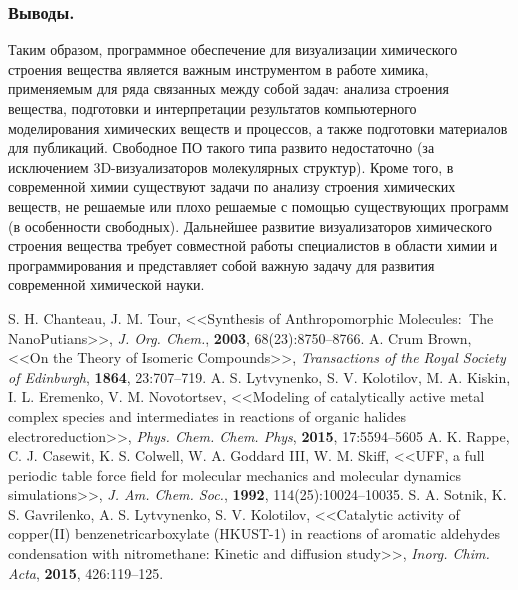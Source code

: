 \documentclass[10pt, a5paper]{article}
\begin{document}
\subsubsection*{Выводы.}

Таким образом, программное обеспечение для визуализации химического строения вещества является важным инструментом в работе химика, применяемым для ряда связанных между собой задач: анализа строения вещества, подготовки и интерпретации результатов компьютерного моделирования химических веществ и процессов, а также подготовки материалов для публикаций. Свободное ПО такого типа развито недостаточно (за исключением 3D-визуализаторов молекулярных структур). Кроме того, в современной химии существуют задачи по анализу строения химических веществ, не решаемые или плохо решаемые с помощью существующих программ (в особенности свободных). Дальнейшее развитие визуализаторов химического строения вещества требует совместной работы специалистов в области химии и программирования и представляет собой важную задачу для развития современной химической науки.

\begin{thebibliography}{99}

 S. H. Chanteau, J. M. Tour, <<Synthesis of Anthropomorphic Molecules:  The NanoPutians>>, \emph{J. Org. Chem.}, \textbf{2003}, 68(23):8750–8766.
 A. Crum Brown, <<On the Theory of Isomeric Compounds>>, \emph{Transactions of the Royal Society of Edinburgh}, \textbf{1864}, 23:707–719.
 A. S. Lytvynenko,   S. V. Kolotilov, M. A. Kiskin, I. L. Eremenko, V. M. Novotortsev, <<Modeling of catalytically active metal complex species and intermediates in reactions of organic halides electroreduction>>, \emph{Phys. Chem. Chem. Phys}, \textbf{2015}, 17:5594–5605
 A. K. Rappe, C. J. Casewit, K. S. Colwell, W. A. Goddard III, W. M. Skiff, <<UFF, a full periodic table force field for molecular mechanics and molecular dynamics simulations>>, \emph{J. Am. Chem. Soc.}, \textbf{1992}, 114(25):10024–10035.
 S. A. Sotnik, K. S. Gavrilenko, A. S. Lytvynenko, S. V. Kolotilov, <<Catalytic activity of copper(II) benzenetricarboxylate (HKUST-1) in reactions of aromatic aldehydes condensation with nitromethane: Kinetic and diffusion study>>, \emph{Inorg. Chim. Acta}, \textbf{2015}, 426:119–125.
\end{thebibliography}
\end{document}
